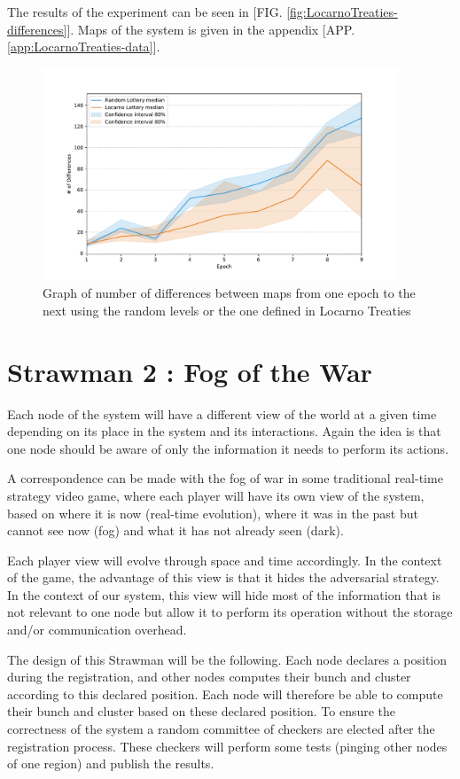 \documentclass[a4paper,11pt,oneside]{report}
\begin{document}
The results of the experiment can be seen in [FIG. \autoref{fig:LocarnoTreaties-differences}]. Maps of
the system is given in the appendix [APP. \autoref{app:LocarnoTreaties-data}].

\begin{figure}[!h] 
\centering
\includegraphics[width=300pt]{figures/LocarnoTreaties-differences}
\caption{Graph of number of differences between maps from one epoch to the next using the random levels or the one defined in Locarno Treaties } \label{fig:LocarnoTreaties-differences}
\end{figure}

\section{Strawman 2 : Fog of the War}

Each node of the system will have a different view of the world at a given time
depending on its place in the system and its interactions. Again the idea is
that one node should be aware of only the information it needs to perform its
actions. 

A correspondence can be made with the fog of war in some traditional real-time
strategy video game, where each player will have its own view of the system,
based on where it is now (real-time evolution), where it was in the past but
cannot see now (fog) and what it has not already seen (dark).

Each player view will evolve through space and time accordingly. In the context
of the game, the advantage of this view is that it hides the adversarial
strategy. In the context of our system, this view will hide most of the
information that is not relevant to one node but allow it to perform its
operation without the storage and/or communication overhead. 

The design of this Strawman will be the following. Each node declares a
position during the registration, and other nodes computes their bunch and
cluster according to this declared position. Each node will therefore be able
to compute their bunch and cluster based on these declared position. To ensure
the correctness of the system a random committee of checkers are elected after
the registration process. These checkers will perform some tests (pinging other
nodes of one region) and publish the results. 
\end{document}
